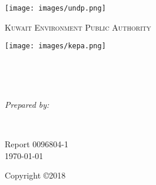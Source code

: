 \documentclass[
12pt, %
oneside, %
english, %
singlespacing, %
nolistspacing, %
liststotoc, %
parskip, %
headsepline, %
chapterinoneline, %
]{MastersDoctoralThesis} %
\author{Brian Freeman, PE} %
\begin{document}
\frontmatter %

\pagestyle{plain} %


\begin{titlepage}
\begin{center}

\vspace*{.02\textheight}
{\scshape\LARGE \univname\par} %
\begin{center}
\texttt{[image: images/undp.png]} %
\end{center}
\textsc{\LARGE Kuwait Environment Public Authority}\\[0.5cm] 
\begin{center}
\texttt{[image: images/kepa.png]} %
\end{center}
\HRule \\[0.4cm] %
{\huge \bfseries \ttitle\par}\vspace{0.4cm} %
\HRule \\[1.5cm] %
\begin{minipage}[t]{0.4\textwidth}
\begin{flushleft} \large
\emph{Prepared by:}\\
{\authorname} %
\end{flushleft}
\end{minipage}
\begin{minipage}[t]{0.4\textwidth}
\begin{flushright} \large

\end{flushright}
\end{minipage}\\[1cm]
 
\vfill

 Report 0096804-1 \\
 
\vfill
{\large \today}\\[2cm] %
\vfill
\end{center}
Copyright \copyright 2018
\end{titlepage}
\end{document}
